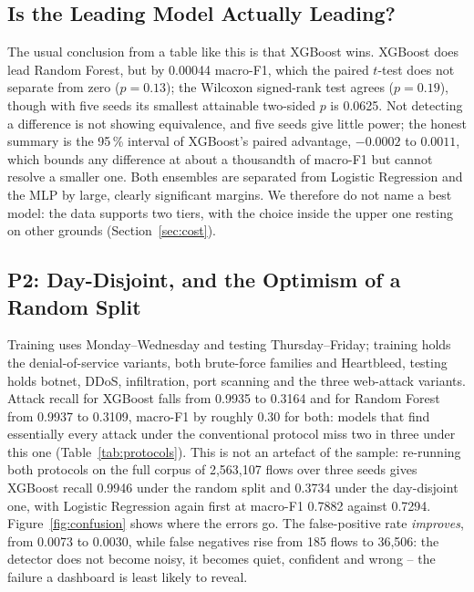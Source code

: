 \documentclass{llncs}
\newcommand{\inputtable}[1]{%
  \IfFileExists{tables/#1.tex}{}{}}
\begin{document}
\subsection{Is the Leading Model Actually Leading?}
\label{sec:paired}
The usual conclusion from a table like this is that XGBoost wins. XGBoost
does lead Random Forest, but by 0.00044 macro-F1, which the paired $t$-test
does not separate from zero ($p=0.13$); the Wilcoxon signed-rank test agrees
($p=0.19$), though with five seeds its smallest attainable two-sided $p$ is
0.0625. Not detecting a difference is not showing equivalence, and five seeds
give little power; the honest summary is the 95\,\% interval of XGBoost's
paired advantage, $-0.0002$ to $0.0011$, which bounds any difference at about
a thousandth of macro-F1 but cannot resolve a smaller one. Both ensembles are
separated from Logistic Regression and the MLP by large, clearly significant
margins. We therefore do not name a best model: the data supports two tiers,
with the choice inside the upper one resting on other grounds
(Section~\ref{sec:cost}).


\subsection{P2: Day-Disjoint, and the Optimism of a Random Split}
\label{sec:p2}
Training uses Monday--Wednesday and testing Thursday--Friday; training holds
the denial-of-service variants, both brute-force families and Heartbleed,
testing holds botnet, DDoS, infiltration, port scanning and the three
web-attack variants. Attack recall for XGBoost falls from 0.9935 to 0.3164
and for Random Forest from 0.9937 to 0.3109, macro-F1 by roughly 0.30 for
both: models that find essentially every attack under the conventional
protocol miss two in three under this one (Table~\ref{tab:protocols}). This is
not an artefact of the sample: re-running both protocols on the full corpus
of 2{,}563{,}107 flows over three seeds gives XGBoost recall 0.9946 under the
random split and 0.3734 under the day-disjoint one, with Logistic Regression
again first at macro-F1 0.7882 against 0.7294.
Figure~\ref{fig:confusion} shows where the errors go. The false-positive rate \emph{improves}, from 0.0073 to
0.0030, while false negatives rise from 185 flows to 36{,}506: the detector
does not become noisy, it becomes quiet, confident and wrong -- the failure
a dashboard is least likely to reveal.
\end{document}
